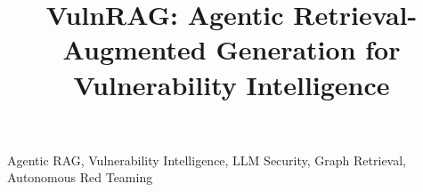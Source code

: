 \documentclass[conference]{IEEEtran}
\begin{document}
\title{VulnRAG: Agentic Retrieval-Augmented Generation for Vulnerability Intelligence}

\author{
}

\maketitle




\begin{IEEEkeywords}
Agentic RAG, Vulnerability Intelligence, LLM Security, Graph Retrieval, Autonomous Red Teaming
\end{IEEEkeywords}













\end{document}
